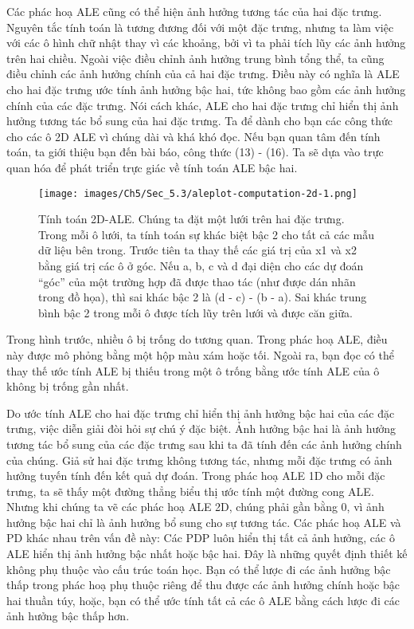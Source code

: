Các phác hoạ ALE cũng có thể hiện ảnh hưởng tương tác của hai đặc trưng. Nguyên tắc tính toán là tương đương đối với một đặc trưng, nhưng ta làm việc với các ô hình chữ nhật thay vì các khoảng, bởi vì ta phải tích lũy các ảnh hưởng trên hai chiều. Ngoài việc điều chỉnh ảnh hưởng trung bình tổng thể, ta cũng điều chỉnh các ảnh hưởng chính của cả hai đặc trưng. Điều này có nghĩa là ALE cho hai đặc trưng ước tính ảnh hưởng bậc hai, tức không bao gồm các ảnh hưởng chính của các đặc trưng. Nói cách khác, ALE cho hai đặc trưng chỉ hiển thị ảnh hưởng tương tác bổ sung của hai đặc trưng. Ta để dành cho bạn các công thức cho các ô 2D ALE vì chúng dài và khá khó đọc. Nếu bạn quan tâm đến tính toán, ta giới thiệu bạn đến bài báo, công thức (13) - (16). Ta sẽ dựa vào trực quan hóa để phát triển trực giác về tính toán ALE bậc hai.
\begin{figure*}[h!]
	\centering
	\texttt{[image: images/Ch5/Sec\_5.3/aleplot-computation-2d-1.png]}
	\label{fig:5_13}
	\caption{Tính toán 2D-ALE. Chúng ta đặt một lưới trên hai đặc trưng. Trong mỗi ô lưới, ta tính toán sự khác biệt bậc 2 cho tất cả các mẫu dữ liệu bên trong. Trước tiên ta thay thế các giá trị của x1 và x2 bằng giá trị các ô ở góc. Nếu a, b, c và d đại diện cho các dự đoán ``góc” của một trường hợp đã được thao tác (như được dán nhãn trong đồ họa), thì sai khác bậc 2 là (d - c) - (b - a). Sai khác trung bình bậc 2 trong mỗi ô được tích lũy trên lưới và được căn giữa.}
\end{figure*}

Trong hình trước, nhiều ô bị trống do tương quan. Trong phác hoạ ALE, điều này được mô phỏng bằng một hộp màu xám hoặc tối. Ngoài ra, bạn đọc có thể thay thế ước tính ALE bị thiếu trong một ô trống bằng ước tính ALE của ô không bị trống gần nhất.

Do ước tính ALE cho hai đặc trưng chỉ hiển thị ảnh hưởng bậc hai của các đặc trưng, việc diễn giải đòi hỏi sự chú ý đặc biệt. Ảnh hưởng bậc hai là ảnh hưởng tương tác bổ sung của các đặc trưng sau khi ta đã tính đến các ảnh hưởng chính của chúng. Giả sử hai đặc trưng không tương tác, nhưng mỗi đặc trưng có ảnh hưởng tuyến tính đến kết quả dự đoán. Trong phác hoạ ALE 1D cho mỗi đặc trưng, ta sẽ thấy một đường thẳng biểu thị ước tính một đường cong ALE. Nhưng khi chúng ta vẽ các phác hoạ ALE 2D, chúng phải gần bằng 0, vì ảnh hưởng bậc hai chỉ là ảnh hưởng bổ sung cho sự tương tác. Các phác hoạ ALE và PD khác nhau trên vấn đề này: Các PDP luôn hiển thị tất cả ảnh hưởng, các ô ALE hiển thị ảnh hưởng bậc nhất hoặc bậc hai. Đây là những quyết định thiết kế không phụ thuộc vào cấu trúc toán học. Bạn có thể lược đi các ảnh hưởng bậc thấp trong phác hoạ phụ thuộc riêng để thu được các ảnh hưởng chính hoặc bậc hai thuần túy, hoặc, bạn có thể ước tính tất cả các ô ALE bằng cách lược đi các ảnh hưởng bậc thấp hơn.

